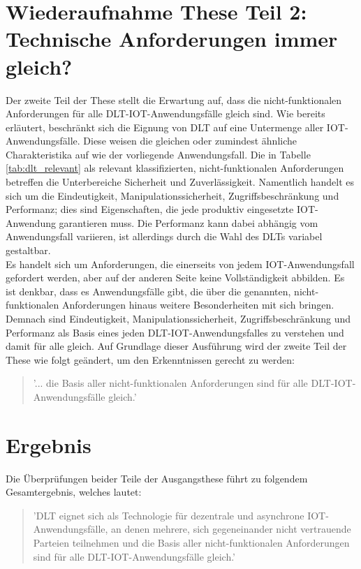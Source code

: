 \section{Wiederaufnahme These Teil 2: Technische Anforderungen immer gleich?}
\label{sec:discussion:part2}
Der zweite Teil der These stellt die Erwartung auf, dass die nicht-funktionalen Anforderungen für alle \ac{DLT}-\ac{IOT}-Anwendungsfälle gleich sind. Wie bereits erläutert, beschränkt sich die Eignung von \ac{DLT} auf eine Untermenge aller \ac{IOT}-Anwendungsfälle. Diese weisen die gleichen oder zumindest ähnliche Charakteristika auf wie der vorliegende Anwendungsfall. Die in Tabelle \ref{tab:dlt_relevant} als relevant klassifizierten, nicht-funktionalen Anforderungen betreffen die Unterbereiche Sicherheit und Zuverlässigkeit. Namentlich handelt es sich um die Eindeutigkeit, Manipulationssicherheit, Zugriffsbeschränkung und Performanz; dies sind Eigenschaften, die jede produktiv eingesetzte \ac{IOT}-Anwendung garantieren muss. Die Performanz kann dabei abhängig vom Anwendungsfall variieren, ist allerdings durch die Wahl des \ac{DLT}s variabel gestaltbar.\\
Es handelt sich um Anforderungen, die einerseits von jedem \ac{IOT}-Anwendungsfall gefordert werden, aber auf der anderen Seite keine Vollständigkeit abbilden. Es ist denkbar, dass es Anwendungsfälle gibt, die über die genannten, nicht-funktionalen Anforderungen hinaus weitere Besonderheiten mit sich bringen. Demnach sind Eindeutigkeit, Manipulationssicherheit, Zugriffsbeschränkung und Performanz als Basis eines jeden \ac{DLT}-\ac{IOT}-Anwendungsfalles zu verstehen und damit für alle gleich. Auf Grundlage dieser Ausführung wird der zweite Teil der These wie folgt geändert, um den Erkenntnissen gerecht zu werden:
\begin{quote}
  '... die Basis aller nicht-funktionalen Anforderungen sind für alle \ac{DLT}-\ac{IOT}-Anwendungsfälle gleich.'
\end{quote}


\section{Ergebnis}
\label{sec:discussion:result}
Die Überprüfungen beider Teile der Ausgangsthese führt zu folgendem Gesamtergebnis, welches lautet:
\begin{quote}
  '\ac{DLT} eignet sich als Technologie für dezentrale und asynchrone \ac{IOT}-Anwendungsfälle, an denen mehrere, sich gegeneinander nicht vertrauende Parteien teilnehmen und die Basis aller nicht-funktionalen Anforderungen sind für alle \ac{DLT}-\ac{IOT}-Anwendungsfälle gleich.'
\end{quote}
